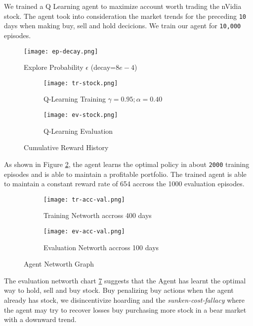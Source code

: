 \documentclass{article} %
\begin{document}
We trained a Q Learning agent to maximize account worth trading the nVidia stock. The agent
took into consideration the market trends for the preceding \verb|10| days when making
buy, sell and hold decicions. We train our agent for \verb|10,000| episodes.


\begin{figure}
    \centering
    \texttt{[image: ep-decay.png]}
    \caption{Explore Probability $\epsilon$ (decay=$8e-4$)}
    \label{fig:ep-decay}
\end{figure}

\begin{figure}[H]
    \begin{subfigure}{.45\textwidth}
        \centering
        \texttt{[image: tr-stock.png]}
        \caption{Q-Learning Training $\gamma=0.95; \alpha=0.40$}
        \label{fig:tr-stock}
    \end{subfigure}
    \hfill
    \begin{subfigure}{.45\textwidth}
        \centering
        \texttt{[image: ev-stock.png]}
        \caption{Q-Learning Evaluation}
        \label{fig:ev-stock}
    \end{subfigure}
    \caption{Cumulative Reward History}
\end{figure}


As shown in Figure \ref{fig:tr-stock}, the agent learns the optimal policy in about
\verb|2000| training episodes and is able to maintain a profitable portfolio. The trained
agent is able to maintain a constant reward rate of 654 accross the 1000 evaluation episodes.


\begin{figure}[H]
    \begin{subfigure}{.45\textwidth}
        \centering
        \texttt{[image: tr-acc-val.png]}
        \caption{Training Networth accross 400 days}
        \label{fig:tr-acc-val}
    \end{subfigure}
    \hfill
    \begin{subfigure}{.45\textwidth}
        \centering
        \texttt{[image: ev-acc-val.png]}
        \caption{Evaluation Networth accross 100 days}
        \label{fig:ev-acc-val}
    \end{subfigure}
    \caption{Agent Networth Graph}
\end{figure}

The evaluation networth chart \ref{fig:ev-acc-val} suggests that the Agent has learnt the
optimal way to hold, sell and buy stock. Buy penalizing buy actions when the agent already
has stock, we disincentivize hoarding and the \textit{sunken-cost-fallacy} where the agent
may try to recover losses buy purchasing more stock in a bear market with a downward trend.
\end{document}
